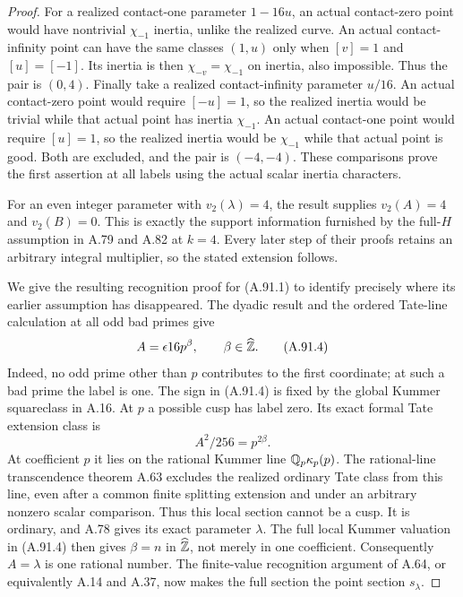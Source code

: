 \begin{proof}
For a realized contact-one parameter $1-16u$, an
actual contact-zero point would have nontrivial
$\chi_{-1}$ inertia, unlike the realized curve.
An actual contact-infinity point can have the same
classes $(1,u)$ only when $[v]=1$ and $[u]=[-1]$.
Its inertia is then $\chi_{-v}=\chi_{-1}$ on inertia,
also impossible.  Thus the pair is $(0,4)$.
Finally take a realized contact-infinity parameter
$u/16$.  An actual contact-zero point would require
$[-u]=1$, so the realized inertia would be trivial
while that actual point has inertia $\chi_{-1}$.
An actual contact-one point would require $[u]=1$,
so the realized inertia would be $\chi_{-1}$ while
that actual point is good.  Both are excluded, and
the pair is $(-4,-4)$.
These comparisons prove the first assertion at all
labels using the actual scalar inertia characters.

For an even integer parameter with $v_2(\lambda)=4$,
the result supplies $v_2(A)=4$ and $v_2(B)=0$.
This is exactly the support information furnished by
the full-$H$ assumption in A.79 and A.82 at $k=4$.
Every later step of their proofs retains an arbitrary
integral multiplier, so the stated extension follows.

We give the resulting recognition proof for (A.91.1)
to identify precisely where its earlier assumption
has disappeared.  The dyadic result and the ordered
Tate-line calculation at all odd bad primes give
\[
                         A=\epsilon16p^\beta,
                              \qquad\beta\in\widehat{\mathbb Z}.
\tag{A.91.4}
\]
Indeed, no odd prime other than $p$ contributes to
the first coordinate; at such a bad prime the label
is one.  The sign in (A.91.4) is fixed by the global
Kummer squareclass in A.16.
At $p$ a possible cusp has label zero.  Its exact
formal Tate extension class is
\[
                              A^2/256=p^{2\beta}.
\tag{A.91.5}
\]
At coefficient $p$ it lies on the rational Kummer
line $\mathbb Q_p\kappa_p(p)$.
The rational-line transcendence theorem A.63
excludes the realized ordinary Tate class from
this line, even after a common finite splitting
extension and under an arbitrary nonzero scalar
comparison.  Thus this local section cannot be a
cusp.  It is ordinary, and A.78 gives its exact
parameter $\lambda$.
The full local Kummer valuation in (A.91.4) then
gives $\beta=n$ in $\widehat{\mathbb Z}$, not merely in
one coefficient.  Consequently $A=\lambda$ is
one rational number.  The finite-value recognition
argument of A.64, or equivalently A.14 and A.37,
now makes the full section the point section
$s_\lambda$.


\end{proof}
